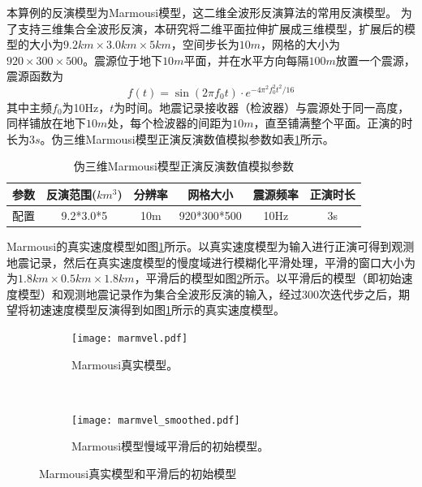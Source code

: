 本算例的反演模型为Marmousi模型，这二维全波形反演算法的常用反演模型。
为了支持三维集合全波形反演，本研究将二维平面拉伸扩展成三维模型，扩展后的模型的大小为$9.2km\times 3.0km \times 5km$，空间步长为$10m$，网格的大小为$920\times 300 \times 500$。震源位于地下$10m$平面，并在水平方向每隔$100m$放置一个震源，震源函数为
\begin{equation}
  f(t)=\sin(2\pi f_0t)\cdot e^{-4\pi^2f_0^2t^2/16}
\end{equation}
其中主频$f_0$为10Hz，$t$为时间。地震记录接收器（检波器）与震源处于同一高度，同样铺放在地下$10m$处，每个检波器的间距为$10m$，直至铺满整个平面。正演的时长为$3s$。伪三维Marmousi模型正演反演数值模拟参数如表\ref{tb:伪三维Marmousi模型正演反演数值模拟参数}所示。

\begin{table}[ht]
\centering
\caption{伪三维Marmousi模型正演反演数值模拟参数}
\label{tb:伪三维Marmousi模型正演反演数值模拟参数}
\begin{tabular}{cccccc}
\hline
参数 & 反演范围($km^3$) & 分辨率 & 网格大小        & 震源频率 & 正演时长 \\\hline
配置 & 9.2*3.0*5     & 10m   & 920*300*500   & 10Hz    & 3s  \\\hline
\end{tabular}
\end{table}

Marmousi的真实速度模型如图\ref{fig:Marmousi精确模型}所示。以真实速度模型为输入进行正演可得到观测地震记录，然后在真实速度模型的慢度域进行模糊化平滑处理，平滑的窗口大小为为$1.8km\times 0.5km\times 1.8km$，平滑后的模型如图\ref{fig:Marmousi模型慢域平滑后的初始模型}所示。以平滑后的模型（即初始速度模型）和观测地震记录作为集合全波形反演的输入，经过300次迭代步之后，期望将初速速度模型反演得到如图\ref{fig:Marmousi精确模型}所示的真实速度模型。

\begin{figure}[ht]
    \centering
    \begin{subfigure}[b]{0.5\textwidth}
        \centering
        \texttt{[image: marmvel.pdf]}
        \caption{Marmousi真实模型。}
        \label{fig:Marmousi精确模型}
    \end{subfigure}%
    ~
    \begin{subfigure}[b]{0.5\textwidth}
        \centering
        \texttt{[image: marmvel\_smoothed.pdf]}
        \caption{Marmousi模型慢域平滑后的初始模型。}
        \label{fig:Marmousi模型慢域平滑后的初始模型}
    \end{subfigure}
    \caption{Marmousi真实模型和平滑后的初始模型}
    \label{fig:Marmousi精确模型和平滑后的初始模型}
\end{figure}


